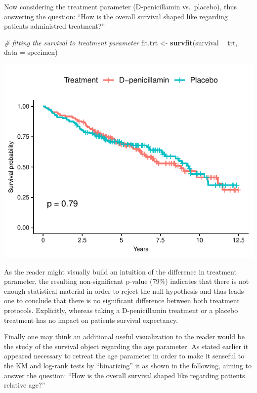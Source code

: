 \documentclass[]{article}
\newenvironment{Shaded}{\begin{snugshade}}{\end{snugshade}}
\newcommand{\KeywordTok}[1]{\textcolor[rgb]{0.13,0.29,0.53}{\textbf{#1}}}
\newcommand{\DataTypeTok}[1]{\textcolor[rgb]{0.13,0.29,0.53}{#1}}
\newcommand{\StringTok}[1]{\textcolor[rgb]{0.31,0.60,0.02}{#1}}
\newcommand{\CommentTok}[1]{\textcolor[rgb]{0.56,0.35,0.01}{\textit{#1}}}
\newcommand{\OperatorTok}[1]{\textcolor[rgb]{0.81,0.36,0.00}{\textbf{#1}}}
\newcommand{\NormalTok}[1]{#1}
\begin{document}
Now considering the treatment parameter (D-penicillamin vs.~placebo),
thus answering the question: ``How is the overall survival shaped like
regarding patients administred treatment?''

\begin{Shaded}
\begin{Highlighting}[]
\CommentTok{# fitting the survival to treatment parameter}
\NormalTok{fit.trt <-}\StringTok{ }\KeywordTok{survfit}\NormalTok{(survival }\OperatorTok{~}\StringTok{ }\NormalTok{trt, }\DataTypeTok{data =}\NormalTok{ specimen)}
\end{Highlighting}
\end{Shaded}

\includegraphics{survival_v5_files/figure-latex/unnamed-chunk-17-1.pdf}

As the reader might visually build an intuition of the difference in
treatment parameter, the resulting non-significant p-value (79\%)
indicates that there is not enough statistical material in order to
reject the null hypothesis and thus leads one to conclude that there is
no significant difference between both treatment protocols. Explicitly,
whereas taking a D-penicillamin treatment or a placebo treatment has no
impact on patients survival expectancy.

Finally one may think an additional useful visualization to the reader
would be the study of the survival object regarding the age parameter.
As stated earlier it appeared necessary to retreat the age parameter in
order to make it senseful to the KM and log-rank tests by ``binarizing''
it as shown in the following, aiming to answer the question: ``How is
the overall survival shaped like regarding patients relative age?''
\end{document}
